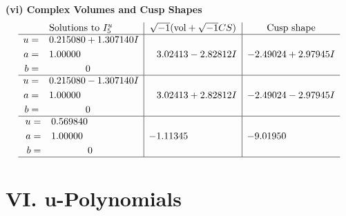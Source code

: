\documentclass[1p]{elsarticle_modified}
\theoremstyle{definition}
\newcommand{\I}{\sqrt{-1}}
\begin{document}
\newpage\flushleft \textbf{(vi) Complex Volumes and Cusp Shapes}
$$\begin{array}{c|c|c}  
\text{Solutions to }I^u_{5}& \I (\text{vol} + \sqrt{-1}CS) & \text{Cusp shape}\\
 \hline 
\begin{aligned}
u &= \phantom{-}0.215080 + 1.307140 I \\
a &= \phantom{-}1.00000\phantom{ +0.000000I} \\
b &= \phantom{-0.000000 } 0\end{aligned}
 & \phantom{-}3.02413 - 2.82812 I & -2.49024 + 2.97945 I \\ \hline\begin{aligned}
u &= \phantom{-}0.215080 - 1.307140 I \\
a &= \phantom{-}1.00000\phantom{ +0.000000I} \\
b &= \phantom{-0.000000 } 0\end{aligned}
 & \phantom{-}3.02413 + 2.82812 I & -2.49024 - 2.97945 I \\ \hline\begin{aligned}
u &= \phantom{-}0.569840\phantom{ +0.000000I} \\
a &= \phantom{-}1.00000\phantom{ +0.000000I} \\
b &= \phantom{-0.000000 } 0\end{aligned}
 & -1.11345\phantom{ +0.000000I} & -9.01950\phantom{ +0.000000I}\\
 \hline 
 \end{array}$$\newpage
\newpage\renewcommand{\arraystretch}{1}
\centering \section*{ VI. u-Polynomials}
\end{document}
